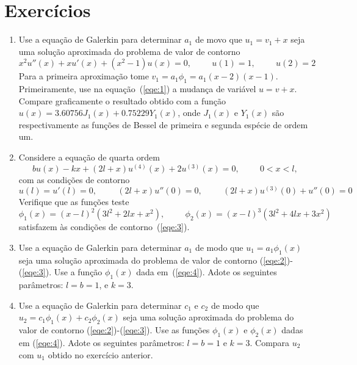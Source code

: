 \documentclass[10pt,a4paper]{article}
\begin{document}
	\section{Exercícios}
	\begin{enumerate}
		\item Use a equação de Galerkin para determinar $a_1$ de movo que $u_1=v_1+x$ seja uma solução aproximada do problema de valor de contorno
	\begin{equation}
		x^2u''(x) + xu'(x)+(x^2-1)u(x)=0, \hspace{1cm} u(1)=1, \hspace{1cm} u(2)=2
		\label{eqe:1}
	\end{equation}
	Para a primeira aproximação tome $v_1=a_1\phi_1=a_1(x-2)(x-1)$. Primeiramente, use na equação~(\ref{eqe:1}) a mudança de variável $u=v+x$. Compare graficamente o resultado obtido com a função $u(x)=3.60756J_1(x)+0.75229Y_1(x)$, onde $J_1(x)$ e $Y_1(x)$ são respectivamente as funções de Bessel de primeira e segunda espécie de ordem um.
	
		\item Considere a equação de quarta ordem
	\begin{equation}
		bu(x)-kx+(2l+x)u^{(4)}(x)+2u^{(3)}(x) = 0, \hspace{1cm}0<x<l,
		\label{eqe:2}
	\end{equation}
	com as condições de contorno
	\begin{equation}
		u(l) = u'(l)=0,\hspace{1cm} (2l+x)u''(0)=0, \hspace{1cm} (2l+x)u^{(3)}(0)+u''(0)=0
		\label{eqe:3}
	\end{equation}
	Verifique que as funções teste
	\begin{equation}
		\phi_1(x) = (x-l)^2(3l^2+2lx+x^2), \hspace{1cm} \phi_2(x)=(x-l)^3(3l^2+4lx+3x^2)
		\label{eqe:4}
	\end{equation}
	satisfazem às condições de contorno~(\ref{eqe:3}).
	
		\item Use a equação de Galerkin para determinar $a_1$ de modo que $u_1=a_1\phi_1(x)$ seja uma solução aproximada do problema de valor de contorno (\ref{eqe:2})-(\ref{eqe:3}). Use a função $\phi_1(x)$ dada em~(\ref{eqe:4}). Adote os seguintes parâmetros: $l=b=1$, e $k=3$.
	
		\item Use a equação de Galerkin para determinar $c_1$ e $c_2$ de modo que $u_2=c_1\phi_1(x)+c_2\phi_2(x)$ seja uma solução aproximada do problema do valor de contorno (\ref{eqe:2})-(\ref{eqe:3}). Use as funções $\phi_1(x)$ e $\phi_2(x)$ dadas em (\ref{eqe:4}). Adote os seguintes parâmetros: $l=b=1$ e $k=3$. Compara $u_2$ com $u_1$ obtido no exercício anterior.
	\end{enumerate}
\end{document}
